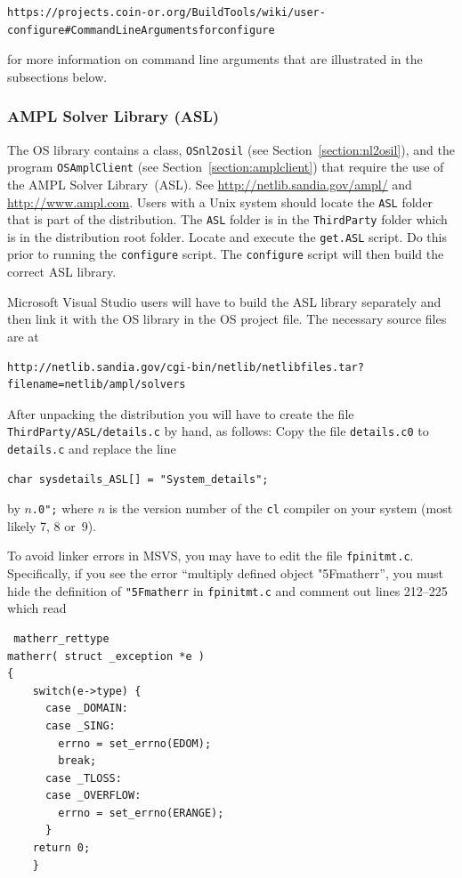 \documentclass[11pt]{article}
\renewcommand{\_}{{\char"5F}}
\renewcommand{\{}{{\char"7B}}
\renewcommand{\}}{{\char"7D}}
\renewcommand{\^}{{\char"0D}}
\renewcommand{\'}{{\char"0D}}
\begin{document}
{\small
\begin{verbatim}
https://projects.coin-or.org/BuildTools/wiki/user-configure#CommandLineArgumentsforconfigure
\end{verbatim}
}
for more information on command line arguments that are illustrated in the subsections below.%


\subsubsection{AMPL Solver Library (ASL)} \label{section:ASL}

%
The OS library contains a class, {\tt OSnl2osil} (see Section~\ref{section:nl2osil}), 
and the program {\tt OSAmplClient} (see Section~\ref{section:amplclient}) that 
require the use of the AMPL Solver Library~(ASL). See \url{http://netlib.sandia.gov/ampl/}  and  \url{http://www.ampl.com}. 
Users with a Unix system should locate the {\tt ASL} folder that is part of the distribution. 
The {\tt ASL} folder is in the {\tt ThirdParty} folder
which is in the distribution root folder. Locate and execute the {\tt get.ASL} script.  Do this prior to running
the {\tt configure} script. The {\tt configure} script will then build the correct ASL library.

Microsoft  Visual Studio users will have to build the ASL library separately and
then link it with the OS library in the OS project file.  The necessary source files are at
\begin{verbatim}
http://netlib.sandia.gov/cgi-bin/netlib/netlibfiles.tar?filename=netlib/ampl/solvers
\end{verbatim}
After unpacking the distribution you will have to create the file 
{\tt ThirdParty/ASL/details.c} by hand,
as follows: Copy the file {\tt details.c0} to {\tt details.c} and replace the
line
\begin{verbatim}
char sysdetails_ASL[] = "System_details";
\end{verbatim}
by
\vskip 8pt
\noindent{\tt char sysdetails\_ASL[] = "MS VC++ }$n${\tt .0";}
\vskip 8pt
\noindent
where $n$ is the version number of the {\tt cl} compiler on your system (most
likely 7, 8 or~9). 

To avoid linker errors in MSVS, you may have to edit the file {\tt fpinitmt.c}. 
Specifically, if you see the error ``multiply defined object \_matherr'', you must
hide the definition of {\tt \_matherr} in {\tt fpinitmt.c} and comment out lines 212--225
which read
\begin{verbatim}
 matherr_rettype
matherr( struct _exception *e )
{
	switch(e->type) {
	  case _DOMAIN:
	  case _SING:
		errno = set_errno(EDOM);
		break;
	  case _TLOSS:
	  case _OVERFLOW:
		errno = set_errno(ERANGE);
	  }
	return 0;
	}
\end{verbatim}
\end{document}
